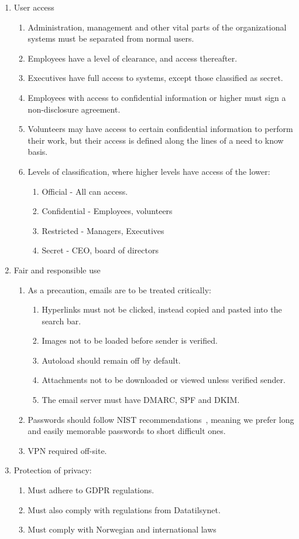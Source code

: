 \begin{enumerate}
  \item User access
  \begin{enumerate}
    \item Administration, management and other vital parts of the organizational systems must be separated from normal users.
    \item Employees have a level of clearance, and access thereafter. 
    \item Executives have full access to systems, except those classified as secret.
    \item Employees with access to confidential information or higher must sign a non-disclosure agreement.
    \item Volunteers may have access to certain confidential information to perform their work, but their access is defined along the lines of a need to know basis.
    \item Levels of classification, where higher levels have access of the lower:
    \begin{enumerate}
      \item Official - All can access.
      \item Confidential - Employees, volunteers
      \item Restricted - Managers, Executives
      \item Secret - CEO, board of directors
    \end{enumerate}
  \end{enumerate}
  \item Fair and responsible use
  \begin{enumerate}
    \item As a precaution, emails are to be treated critically: \label{emailfair}
    \begin{enumerate}
      \item Hyperlinks must not be clicked, instead copied and pasted into the search bar.
      \item Images not to be loaded before sender is verified.
      \item Autoload should remain off by default.
      \item Attachments not to be downloaded or viewed unless verified sender.
      \item The email server must have DMARC, SPF and DKIM.
    \end{enumerate}
    \item Passwords should follow NIST recommendations~\cite{nistpassword}, meaning we prefer long and easily memorable passwords to short difficult ones.
    \item VPN required off-site.
  \end{enumerate}
  \item Protection of privacy:
  \begin{enumerate}
    \item Must adhere to GDPR regulations.
    \item Must also comply with regulations from Datatilsynet.
    \item Must comply with Norwegian and international laws
  \end{enumerate}
\end{enumerate}

